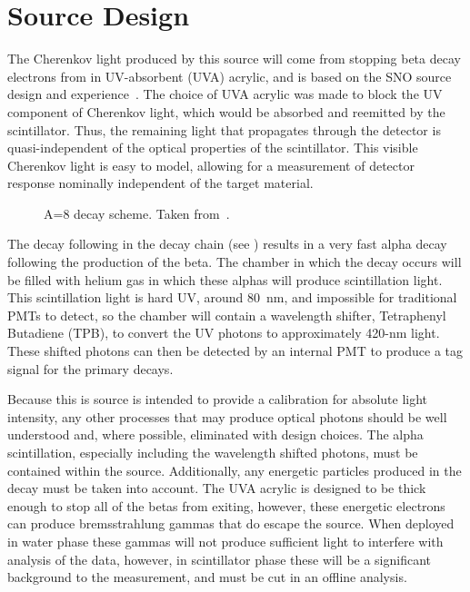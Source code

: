 \section{Source Design}
\label{chap:design}

The Cherenkov light produced by this source will come from stopping beta decay electrons from \Li in UV-absorbent (UVA) acrylic, and is based on the SNO \Li source design and experience~\cite{Tagg:2002,Tagg:2001}.
The choice of UVA acrylic was made to block the UV component of Cherenkov light, which would be absorbed and reemitted by the scintillator.
Thus, the remaining light that propagates through the {\snop} detector is quasi-independent of the optical properties of the {\labppo} scintillator. 
This visible Cherenkov light is easy to model, allowing for a measurement of detector response nominally independent of the target material.

\begin{figure}[]
\caption{\label{fig:decayscheme} A=8 decay scheme. Taken from~\cite{Tagg:2001}.}
\end{figure}

The decay following \Li in the decay chain (see ) results in a very fast alpha decay following the production of the beta.
The chamber in which the decay occurs will be filled with helium gas in which these alphas will produce scintillation light.
This scintillation light is hard UV, around 80~nm, and impossible for traditional PMTs to detect, so the chamber will contain a wavelength shifter, Tetraphenyl Butadiene (TPB), to convert the UV photons to approximately 420-nm light.
These shifted photons can then be detected by an internal PMT to produce a tag signal for the primary \Li decays.

Because this is source is intended to provide a calibration for absolute light intensity, any other processes that may produce optical photons should be well understood and, where possible, eliminated with design choices.
The alpha scintillation, especially including the wavelength shifted photons, must be contained within the source. 
Additionally, any energetic particles produced in the \Li decay must be taken into account.
The UVA acrylic is designed to be thick enough to stop all of the \Li betas from exiting, however, these energetic electrons can produce bremsstrahlung gammas that do escape the source.
When deployed in water phase these gammas will not produce sufficient light to interfere with analysis of the data, however, in scintillator phase these will be a significant background to the measurement, and must be cut in an offline analysis. 

